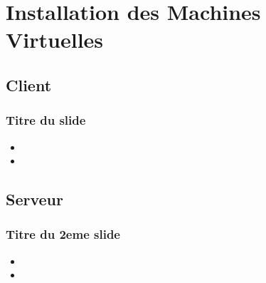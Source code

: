 \section{Installation des Machines Virtuelles}

	\subsection{Client}
		\begin{frame}
		    \frametitle{\textbf{Titre du slide}}
			\begin{itemize}
				 \item 
				 \item 
			\end{itemize}
		\end{frame}

\subsection{Serveur}
	\begin{frame}
		\frametitle{\textbf{Titre du 2eme slide}}
		\begin{itemize}
			\item 
			\item 
		\end{itemize}
	\end{frame}
